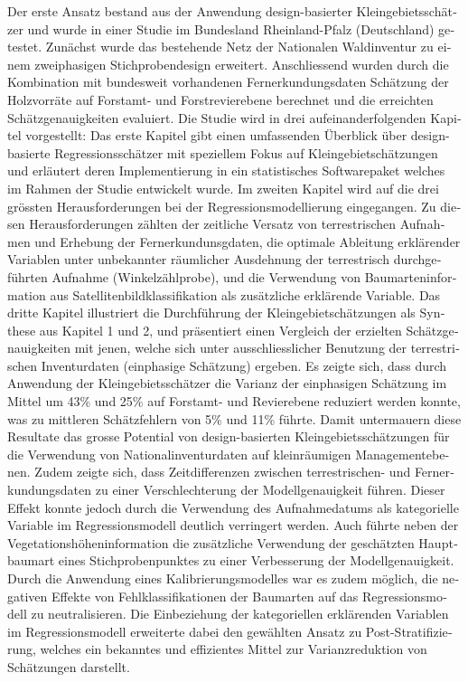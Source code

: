 \begin{otherlanguage}{ngerman}
Der erste Ansatz bestand aus der Anwendung design-basierter Kleingebietsschätzer und wurde in einer Studie im Bundesland Rheinland-Pfalz (Deutschland) getestet. Zunächst wurde das bestehende Netz der Nationalen Waldinventur zu einem zweiphasigen Stichprobendesign erweitert. Anschliessend wurden durch die Kombination mit bundesweit vorhandenen Fernerkundungsdaten Schätzung der Holzvorräte auf Forstamt- und Forstrevierebene berechnet und die erreichten Schätzgenauigkeiten evaluiert. Die Studie wird in drei aufeinanderfolgenden Kapitel vorgestellt: Das erste Kapitel gibt einen umfassenden Überblick über design-basierte Regressionsschätzer mit speziellem Fokus auf Kleingebietschätzungen und erläutert deren Implementierung in ein statistisches Softwarepaket welches im Rahmen der Studie entwickelt wurde. Im zweiten Kapitel wird auf die drei grössten Herausforderungen bei der Regressionsmodellierung eingegangen. Zu diesen Herausforderungen zählten der zeitliche Versatz von terrestrischen Aufnahmen und Erhebung der Fernerkundunsgdaten, die optimale Ableitung erklärender Variablen unter unbekannter räumlicher Ausdehnung der terrestrisch durchgeführten Aufnahme (Winkelzählprobe), und die Verwendung von Baumarteninformation aus Satellitenbildklassifikation als zusätzliche erklärende Variable. Das dritte Kapitel illustriert die Durchführung der Kleingebietschätzungen als Synthese aus Kapitel 1 und 2, und präsentiert einen Vergleich der erzielten Schätzgenauigkeiten mit jenen, welche sich unter ausschliesslicher Benutzung der terrestrischen Inventurdaten (einphasige Schätzung) ergeben. Es zeigte sich, dass durch Anwendung der Kleingebietsschätzer die Varianz der einphasigen Schätzung im Mittel um 43\% und 25\% auf Forstamt- und Revierebene reduziert werden konnte, was zu mittleren Schätzfehlern von 5\% und 11\% führte. Damit untermauern diese Resultate das grosse Potential von design-basierten Kleingebietsschätzungen für die Verwendung von Nationalinventurdaten auf kleinräumigen Managementebenen. Zudem zeigte sich, dass Zeitdifferenzen zwischen terrestrischen- und Fernerkundungsdaten zu einer Verschlechterung der Modellgenauigkeit führen. Dieser Effekt konnte jedoch durch die Verwendung des Aufnahmedatums als kategorielle Variable im Regressionsmodell deutlich verringert werden. Auch führte neben der Vegetationshöheninformation die zusätzliche Verwendung der geschätzten Hauptbaumart eines Stichprobenpunktes zu einer Verbesserung der Modellgenauigkeit. Durch die Anwendung eines Kalibrierungsmodelles war es zudem möglich, die negativen Effekte von Fehlklassifikationen der Baumarten auf das Regressionsmodell zu neutralisieren. Die Einbeziehung der kategoriellen erklärenden Variablen im Regressionsmodell erweiterte dabei den gewählten Ansatz zu Post-Stratifizierung, welches ein bekanntes und effizientes Mittel zur Varianzreduktion von Schätzungen darstellt.\par


\end{otherlanguage}
